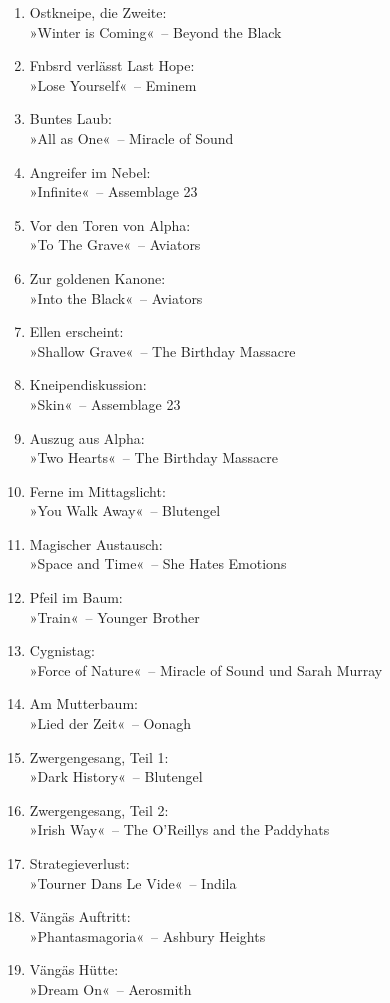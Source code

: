 \begin{enumerate}
    \item Ostkneipe, die Zweite:\\ »Winter is Coming«~– Beyond the Black
    \item Fnbsrd verlässt Last Hope:\\ »Lose Yourself«~– Eminem
    \item Buntes Laub:\\ »All as One«~– Miracle of Sound
    \item Angreifer im Nebel:\\ »Infinite«~– Assemblage 23
    \item Vor den Toren von Alpha:\\ »To The Grave«~– Aviators
    \item Zur goldenen Kanone:\\ »Into the Black«~– Aviators
    \item Ellen erscheint:\\ »Shallow Grave«~– The Birthday Massacre
    \item Kneipendiskussion:\\ »Skin«~– Assemblage 23
    \item Auszug aus Alpha:\\ »Two Hearts«~– The Birthday Massacre
    \item Ferne im Mittagslicht:\\ »You Walk Away«~– Blutengel
    \item Magischer Austausch:\\ »Space and Time«~– She Hates Emotions
    \item Pfeil im Baum:\\ »Train«~– Younger Brother
    \item Cygnistag:\\ »Force of Nature«~– Miracle of Sound und Sarah Murray
    \item Am Mutterbaum:\\ »Lied der Zeit«~– Oonagh
    \item Zwergengesang, Teil 1:\\ »Dark History«~– Blutengel
    \item Zwergengesang, Teil 2:\\ »Irish Way«~– The O’Reillys and the Paddyhats
    \item Strategieverlust:\\ »Tourner Dans Le Vide«~– Indila
    \item Vängäs Auftritt:\\ »Phantasmagoria«~– Ashbury Heights
    \item Vängäs Hütte:\\ »Dream On«~– Aerosmith

\end{enumerate}
